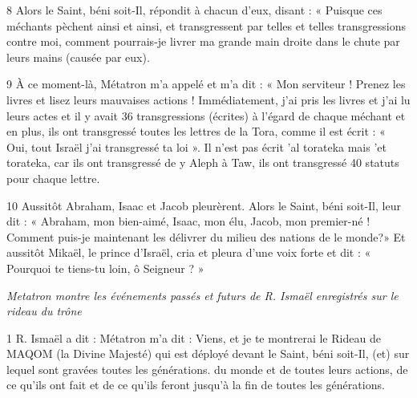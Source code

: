 \par 8 Alors le Saint, béni soit-Il, répondit à chacun d'eux, disant : « Puisque ces méchants pèchent ainsi et ainsi, et transgressent par telles et telles transgressions contre moi, comment pourrais-je livrer ma grande main droite dans le chute par leurs mains (causée par eux).

\par 9 À ce moment-là, Métatron m'a appelé et m'a dit : « Mon serviteur ! Prenez les livres et lisez leurs mauvaises actions ! Immédiatement, j'ai pris les livres et j'ai lu leurs actes et il y avait 36 ​​transgressions (écrites) à l'égard de chaque méchant et en plus, ils ont transgressé toutes les lettres de la Tora, comme il est écrit : « Oui, tout Israël j’ai transgressé ta loi ». Il n'est pas écrit 'al torateka mais 'et torateka, car ils ont transgressé de y Aleph à Taw, ils ont transgressé 40 statuts pour chaque lettre.

\par 10 Aussitôt Abraham, Isaac et Jacob pleurèrent. Alors le Saint, béni soit-Il, leur dit : « Abraham, mon bien-aimé, Isaac, mon élu, Jacob, mon premier-né ! Comment puis-je maintenant les délivrer du milieu des nations de le monde?» Et aussitôt Mikaël, le prince d'Israël, cria et pleura d'une voix forte et dit : « Pourquoi te tiens-tu loin, ô Seigneur ? »



\par \textit{Metatron montre les événements passés et futurs de R. Ismaël enregistrés sur le rideau du trône}

\par 1 R. Ismaël a dit : Métatron m'a dit : Viens, et je te montrerai le Rideau de MAQOM (la Divine Majesté) qui est déployé devant le Saint, béni soit-Il, (et) sur lequel sont gravées toutes les générations. du monde et de toutes leurs actions, de ce qu'ils ont fait et de ce qu'ils feront jusqu'à la fin de toutes les générations.

